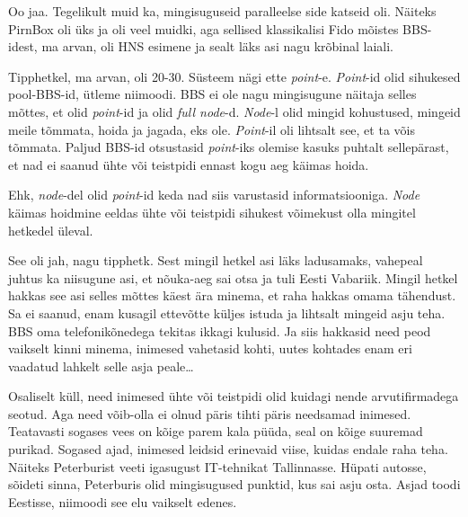                  
Oo jaa. Tegelikult muid ka, mingisuguseid paralleelse side katseid oli. Näiteks 
PirnBox oli üks ja oli veel muidki, aga sellised 
klassikalisi Fido  mõistes BBS-idest, ma arvan, oli HNS esimene ja sealt läks 
asi nagu krõbinal laiali.
                 
                 
Tipphetkel, ma arvan, oli 20-30. Süsteem nägi ette \emph{point}-e. 
\emph{Point}-id olid sihukesed pool-BBS-id, ütleme niimoodi. BBS ei ole nagu 
mingisugune näitaja selles mõttes, et olid \emph{point}-id ja olid \emph{full 
node}-d. \emph{Node}-l olid mingid kohustused, mingeid meile tõmmata, hoida ja 
jagada, eks ole. \emph{Point}-il oli lihtsalt see, et ta võis tõmmata. Paljud 
BBS-id otsustasid \emph{point}-iks  olemise kasuks puhtalt sellepärast, et nad 
ei saanud ühte või teistpidi ennast kogu aeg käimas hoida.
                 
Ehk, \emph{node}-del olid \emph{point}-id keda nad siis varustasid 
informatsiooniga. \emph{Node} käimas hoidmine eeldas ühte või teistpidi 
sihukest võimekust olla  mingitel hetkedel üleval.
                 

See oli jah, nagu tipphetk. Sest mingil hetkel asi läks ladusamaks, vahepeal 
juhtus ka niisugune asi, et  nõuka-aeg sai otsa ja tuli Eesti Vabariik. Mingil 
hetkel hakkas see asi selles mõttes käest ära minema, et raha hakkas omama 
tähendust. Sa ei saanud, enam kusagil ettevõtte küljes istuda ja lihtsalt 
mingeid asju teha. BBS oma telefonikõnedega tekitas ikkagi kulusid. Ja siis 
hakkasid need peod vaikselt kinni minema, inimesed vahetasid kohti, uutes 
kohtades enam eri vaadatud lahkelt selle asja peale\ldots


Osaliselt küll, need inimesed ühte või teistpidi olid kuidagi nende 
arvutifirmadega seotud. Aga need võib-olla ei olnud päris tihti päris needsamad 
inimesed. Teatavasti sogases vees on kõige parem kala püüda, seal on kõige 
suuremad purikad. Sogased ajad, inimesed leidsid erinevaid viise, kuidas endale 
raha teha. Näiteks Peterburist veeti igasugust IT-tehnikat Tallinnasse. Hüpati 
autosse, sõideti sinna, Peterburis olid mingisugused punktid, kus sai asju 
osta. Asjad toodi Eestisse, niimoodi see elu vaikselt edenes.
                 
